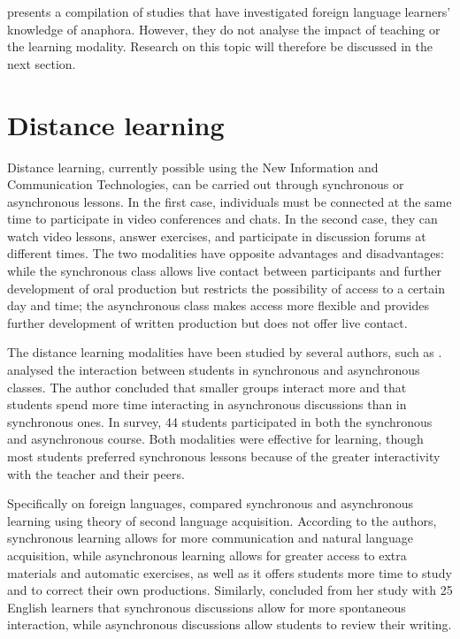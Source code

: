 \documentclass{textolivre}
\begin{document}
\textcite[p. 608-9]{ellis_study_2008} presents a compilation of studies that have
investigated foreign language learners' knowledge of anaphora. However,
they do not analyse the impact of teaching or the learning modality.
Research on this topic will therefore be discussed in the next section.


\section{Distance learning}\label{sec-dist-learn}
Distance learning, currently possible using the New Information and
Communication Technologies, can be carried out through synchronous or
asynchronous lessons. In the first case, individuals must be connected
at the same time to participate in video conferences and chats. In the
second case, they can watch video lessons, answer exercises, and
participate in discussion forums at different times. The two modalities
have opposite advantages and disadvantages: while the synchronous class
allows live contact between participants and further development of oral
production but restricts the possibility of access to a certain day and
time; the asynchronous class makes access more flexible and provides
further development of written production but does not offer live
contact.

The distance learning modalities have been studied by several authors,
such as \textcite{chou_comparative_2002,skylar_comparison_2009}. \textcite{chou_comparative_2002} analysed the
interaction between students in synchronous and asynchronous classes.
The author concluded that smaller groups interact more and that students
spend more time interacting in asynchronous discussions than in
synchronous ones. In  survey, 44 students participated in
both the synchronous and asynchronous course. Both modalities were
effective for learning, though most students preferred synchronous
lessons because of the greater interactivity with the teacher and their
peers.

Specifically on foreign languages, \textcite{chen_adoption_2007} compared
synchronous and asynchronous learning using  theory of
second language acquisition. According to the authors, synchronous
learning allows for more communication and natural language acquisition,
while asynchronous learning allows for greater access to extra materials
and automatic exercises, as well as it offers students more time to
study and to correct their own productions. Similarly, 
concluded from her study with 25 English learners that synchronous
discussions allow for more spontaneous interaction, while asynchronous
discussions allow students to review their writing.
\end{document}
